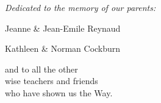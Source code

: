 {\begin{minipage}[c][\textheight][c]{\paperwidth}
\end{minipage}

\clearpage\thispagestyle{empty}



\cleardoublepage\thispagestyle{empty}

\tableofcontents*

\thispagestyle{empty}

\clearpage\thispagestyle{empty}

\mbox{}\vspace*{-\headsep}

\noindent%
\begin{minipage}[c][\textheight][c]{\paperwidth}

\noindent\hspace*{-20mm}%
\begin{minipage}{\paperwidth}\setlength{\parskip}{1em}
\centering

{\itshape Dedicated to the memory of our parents:

Jeanne \& Jean-Emile Reynaud

Kathleen \& Norman Cockburn

and to all the other\\
wise teachers and friends\\
who have shown us the Way.}

\end{minipage}

\end{minipage}


}
